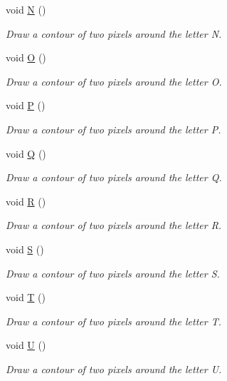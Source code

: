 \begin{DoxyCompactItemize}
void \mbox{\hyperlink{class_font_v3_a0652c4fe89bbd11a617050abb6ed6a96}{N}} ()
\begin{DoxyCompactList}\small\item\em Draw a contour of two pixels around the letter N. \end{DoxyCompactList}\item 
void \mbox{\hyperlink{class_font_v3_a7e65a98126807fe71b04dee05153a858}{O}} ()
\begin{DoxyCompactList}\small\item\em Draw a contour of two pixels around the letter O. \end{DoxyCompactList}\item 
void \mbox{\hyperlink{class_font_v3_a0996f6439985cf592decdde1174a7c56}{P}} ()
\begin{DoxyCompactList}\small\item\em Draw a contour of two pixels around the letter P. \end{DoxyCompactList}\item 
void \mbox{\hyperlink{class_font_v3_af6a1481c838fb835e0fecd8d13bf8781}{Q}} ()
\begin{DoxyCompactList}\small\item\em Draw a contour of two pixels around the letter Q. \end{DoxyCompactList}\item 
void \mbox{\hyperlink{class_font_v3_abc320973012fd3dec227e60c2269d338}{R}} ()
\begin{DoxyCompactList}\small\item\em Draw a contour of two pixels around the letter R. \end{DoxyCompactList}\item 
void \mbox{\hyperlink{class_font_v3_a522d4f1c025929b406fc4be2659c6545}{S}} ()
\begin{DoxyCompactList}\small\item\em Draw a contour of two pixels around the letter S. \end{DoxyCompactList}\item 
void \mbox{\hyperlink{class_font_v3_ac1e011dfdcf4321ea84968929c777d2a}{T}} ()
\begin{DoxyCompactList}\small\item\em Draw a contour of two pixels around the letter T. \end{DoxyCompactList}\item 
void \mbox{\hyperlink{class_font_v3_a579b8cfde4219c194d730f3b9e0326aa}{U}} ()
\begin{DoxyCompactList}\small\item\em Draw a contour of two pixels around the letter U. \end{DoxyCompactList}\item 

\end{DoxyCompactItemize}
